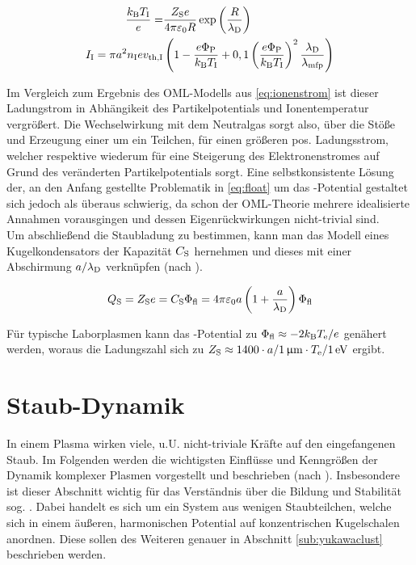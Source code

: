       \begin{align}
        \frac{k_\text{B}T_\text{I}}{e}=&\frac{Z_\text{S}e}{4\pi\varepsilon_\text{0}R}\exp\left(\frac{R}{\lambda_\text{D}}\right) \label{eq:bestimmR} \\
        I_\text{I}=\pi a^{2} n_\text{I}e v_\text{th,I}&\left(1-\frac{e\Phi_\text{P}}{k_\text{B}T_\text{I}}+0,1\left(\frac{e\Phi_\text{P}}{k_\text{B}T_\text{I}}\right)^{2}\frac{\lambda_\text{D}}{\lambda_\text{mfp}}\right) \label{eq:ionstromkorr}
      \end{align}

    Im Vergleich zum Ergebnis des OML-Modells aus \autoref{eq:ionenstrom} ist dieser Ladungstrom in Abh\"angikeit des Partikelpotentials und Ionentemperatur vergr\"o{\ss}ert. Die Wechselwirkung mit dem Neutralgas sorgt also, \"uber die St\"o{\ss}e und Erzeugung einer  um ein Teilchen, f\"ur einen gr\"o{\ss}eren pos. Ladungsstrom, welcher respektive wiederum f\"ur eine Steigerung des Elektronenstromes auf Grund des ver\"anderten Partikelpotentials sorgt. Eine selbstkonsistente L\"osung der, an den Anfang gestellte Problematik in \autoref{eq:float} um das -Potential gestaltet sich jedoch als \"uberaus schwierig, da schon der OML-Theorie mehrere idealisierte Annahmen vorausgingen und dessen Eigenr\"uckwirkungen nicht-trivial sind.\\
    Um abschließend die Staubladung zu bestimmen, kann man das Modell eines Kugelkondensators der Kapazität $C_\text{S}$ hernehmen und dieses mit einer Abschirmung $a/\lambda_\text{D}$ verknüpfen (nach \cite{Melzer12}).

      \begin{align}
        Q_\text{S}=Z_\text{S}e=C_\text{S}\Phi_\text{fl}=4\pi\varepsilon_\text{0}a\left(1+\frac{a}{\lambda_\text{D}}\right)\Phi_\text{fl} \label{eq:ladung}
      \end{align}

    Für typische Laborplasmen kann das -Potential zu $\Phi_\text{fl}\approx-2k_\text{B}T_\text{e}/e$ genähert werden, woraus die Ladungszahl sich zu $Z\ix{S}\approx1400\cdot a/\unit[1]{\upmu m}\cdot T\ix{e}/\unit[1]{eV}$ ergibt.

  \section{Staub-Dynamik}\label{sub:dynamik}

    In einem Plasma wirken viele, u.U. nicht-triviale Kräfte auf den eingefangenen Staub. Im Folgenden werden die wichtigsten Einflüsse und Kenngrößen der Dynamik komplexer Plasmen vorgestellt und beschrieben (nach \cite{Melzer10}). Insbesondere ist dieser Abschnitt wichtig für das Verständnis über die Bildung und Stabilität sog. . Dabei handelt es sich um ein System aus wenigen Staubteilchen, welche sich in einem äußeren, harmonischen Potential auf konzentrischen Kugelschalen anordnen. Diese sollen des Weiteren genauer in Abschnitt \ref{sub:yukawaclust} beschrieben werden.


